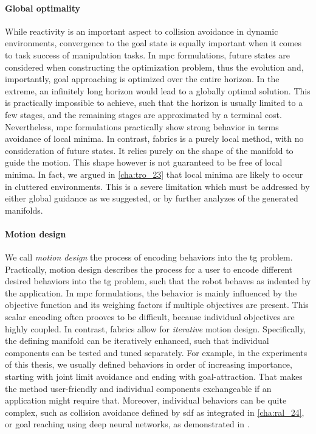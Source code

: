 \paragraph{Global optimality}
\label{par:discussion_global_optimiality}

While reactivity is an important aspect to collision
avoidance in dynamic environments, convergence to the goal
state is equally important when it comes to task success of
manipulation tasks. In \ac{mpc} formulations, future states
are considered when constructing the optimization problem,
thus the evolution and, importantly, goal approaching is
optimized over the entire horizon. In the extreme, an
infinitely long horizon would lead to a globally optimal
solution. This is practically impossible to achieve, such
that the horizon is usually limited to a few stages, and the
remaining stages are approximated by a terminal cost.
Nevertheless, \ac{mpc} formulations practically show strong 
behavior in terms avoidance of local minima. In contrast,
\ac{fabrics} is a purely local method, with no consideration
of future states. It relies purely on the shape of the
manifold to guide the motion. This shape however is not
guaranteed to be free of local minima. In fact, we argued in 
\cref{cha:tro_23} that local minima are likely to occur in
cluttered environments. This is a severe limitation which
must be addressed by either global guidance as we suggested,
or by further analyzes of the generated manifolds.

\paragraph{Motion design}
\label{par:motion_design}

We call \textit{motion design} the process of encoding
behaviors into the \ac{tg} problem. Practically, motion
design describes the 
process for a user to encode different desired behaviors
into the \ac{tg} problem, such that the robot behaves as
indented by the application. In \ac{mpc} formulations,
the behavior is mainly influenced by the objective function
and its weighing factors if multiple objectives are present.
This scalar encoding often prooves to be difficult, because
individual objectives are highly coupled. In contrast,
\ac{fabrics} allow for \textit{iterative} motion design.
Specifically, the defining manifold can be iteratively
enhanced, such that individual components can be tested and
tuned separately. For example, in the experiments of this
thesis, we usually defined behaviors in order of
increasing importance, starting with joint limit avoidance
and ending with goal-attraction. That makes the method
user-friendly and individual components exchangeable if an
application might require that. Moreover, individual
behaviors can be quite complex, such as collision avoidance
defined by \ac{sdf} as integrated in \cref{cha:ral_24},
or goal reaching using
deep neural networks, as demonstrated in \cite{xie2023neural}.

